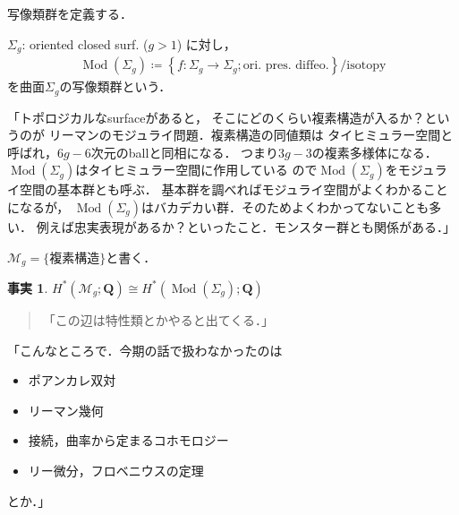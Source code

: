 \documentclass[12pt, a4paper, dvipdfmx, draft]{jsarticle}
\theoremstyle{definition}
\newtheorem*{Fact*}{事実}
\newcommand{\qq}{\mathbf{Q}}
\newcommand{\mcal}{\mathcal}
\newcommand{\Mod}{\mathop{\mathrm{Mod}}\nolimits}
\theoremstyle{mystyle}
\numberwithin{equation}{section} %
\begin{document}
写像類群を定義する．

$\Sigma_{g}$: oriented closed surf. ($g>1$)
に対し，
\begin{align*}
    \Mod(\Sigma_{g})\coloneqq\left\{f\colon\Sigma_{g}\to\Sigma_{g};\text{ori. pres. diffeo.}\right\}/\text{isotopy}
\end{align*}
を曲面$\Sigma_{g}$の写像類群という．

「トポロジカルなsurfaceがあると，
そこにどのくらい複素構造が入るか？というのが
リーマンのモジュライ問題．複素構造の同値類は
タイヒミュラー空間と呼ばれ，$6g-6$次元のballと同相になる．
つまり$3g-3$の複素多様体になる．
$\Mod(\Sigma_{g})$はタイヒミュラー空間に作用している
ので$\Mod(\Sigma_{g})$をモジュライ空間の基本群とも呼ぶ．
基本群を調べればモジュライ空間がよくわかることになるが，
$\Mod(\Sigma_{g})$はバカデカい群．そのためよくわかってないことも多い．
例えば忠実表現があるか？といったこと．モンスター群とも関係がある．」

$\mcal{M}_{g} = \{\text{複素構造}\}$と書く．
\begin{Fact*}
    $H^{\ast}(\mcal{M}_{g};\qq)\cong H^{\ast}(\Mod(\Sigma_{g});\qq)$
\end{Fact*}

\begin{quote}
    「この辺は特性類とかやると出てくる．」
\end{quote}

「こんなところで．今期の話で扱わなかったのは
\begin{itemize}
    \item ポアンカレ双対
    \item リーマン幾何
    \item 接続，曲率から定まるコホモロジー
    \item リー微分，フロベニウスの定理
\end{itemize}
とか．」
\end{document}

